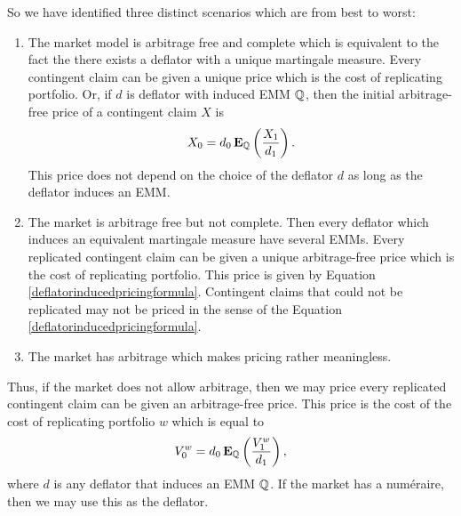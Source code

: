 So we have identified three distinct scenarios which are from best to worst:
  \begin{enumerate}[labelindent=\parindent, leftmargin=*]
    \item The market model is arbitrage free and complete which is equivalent to the fact the there exists a deflator with a unique martingale measure. Every contingent claim can be given a unique price which is the cost of replicating portfolio. Or, if $d$ is deflator with induced EMM $\mathbb{Q}$, then the initial arbitrage-free price of a contingent claim $X$ is
    	\begin{align}
    		\label{deflatorinducedpricingformula}
	    	X_0 = d_0 \operatorname{\boldsymbol{\mathrm{E}}}_{\mathbb{Q}} \left( \frac{X_1}{d_1} \right) .
    	\end{align}
    This price does not depend on the choice of the deflator $d$ as long as the deflator induces an EMM.
    \item The market is arbitrage free but not complete. Then every deflator which induces an equivalent martingale measure have several EMMs. Every replicated contingent claim can be given a unique arbitrage-free price which is the cost of replicating portfolio. This price is given by Equation \ref{deflatorinducedpricingformula}. Contingent claims that could not be replicated may not be priced in the sense of the Equation \ref{deflatorinducedpricingformula}.
    \item The market has arbitrage which makes pricing rather meaningless. 
  \end{enumerate}

Thus, if the market does not allow arbitrage, then we may price every replicated contingent claim can be given an arbitrage-free price. This price is the cost of the cost of replicating portfolio $w$ which is equal to
    \begin{align}
		V^w_0 = d_0 \operatorname{\boldsymbol{\mathrm{E}}}_{\mathbb{Q}} \left( \frac{V^w_1}{d_1} \right) ,
	\end{align}
where $d$ is any deflator that induces an EMM $\mathbb{Q}$. If the market has a num\'{e}raire, then we may use this as the deflator.
  


